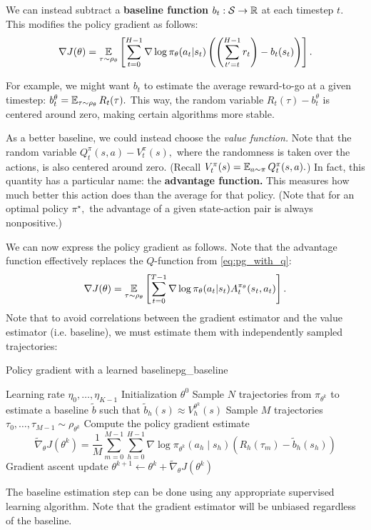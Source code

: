 \documentclass[\main/main]{subfiles}
\begin{document}
We can instead subtract a \textbf{baseline function} $b_t : \mathcal{S} \to \mathbb{R}$ at each timestep $t.$ This modifies the policy gradient as follows: \begin{equation}
    \nabla J(\theta) = \operatorname*{\mathbb{E}}_{\tau \sim \rho_\theta} \left[
        \sum_{t=0}^{H-1} \nabla \log \pi_\theta (a_t | s_t) \left(
        \left(
        \sum_{t' = t}^{H-1} r_t
        \right)
        - b_t(s_t)
        \right)
        \right].
    \label{eq:pg_baseline}
\end{equation}


For example, we might want $b_t$ to estimate the average reward-to-go at a given timestep: $b_t^\theta = \operatorname*{\mathbb{E}}_{\tau \sim \rho_\theta} R_t(\tau).$ This way,
the random variable $R_t(\tau) - b_t^\theta$ is centered around zero,
making certain algorithms more stable.

As a better baseline, we could instead choose the \emph{value function.} Note that the random variable $Q^\pi_t(s, a) - V^\pi_t(s),$ where the randomness is taken over the actions,
is also centered around zero. (Recall $V^\pi_t(s) = \operatorname*{\mathbb{E}}_{a \sim \pi} Q^\pi_t(s, a).$) In fact, this quantity has a particular name: the \textbf{advantage function.}
This measures how much better this action does than the average for that policy.
(Note that for an optimal policy $\pi^\star,$ the advantage of a given state-action pair is always nonpositive.)

We can now express the policy gradient as follows. Note that the advantage function effectively replaces the $Q$-function from \autoref{eq:pg_with_q}: \begin{equation}
    \nabla J(\theta) = \operatorname*{\mathbb{E}}_{\tau \sim \rho_\theta} \left[
        \sum_{t=0}^{T-1} \nabla \log \pi_\theta(a_t | s_t) A^{\pi_\theta}_t (s_t, a_t)
        \right].
    \label{eq:pg_advantage}
\end{equation}
Note that to avoid correlations between the gradient estimator and the value estimator (i.e. baseline), we must estimate them with independently sampled trajectories:
\begin{definition}{Policy gradient with a learned baseline}{pg_baseline}
    \begin{algorithmic}
        \Require Learning rate $\eta_0, \dots, \eta_{K-1}$
        \Require Initialization $\theta^0$
        \State Sample $N$ trajectories from $\pi_{\theta^k}$ to estimate a baseline $\tilde b$ such that $\tilde b_h(s) \approx V_h^{\theta^k}(s)$
        \State Sample $M$ trajectories $\tau_0, \dots, \tau_{M-1} \sim \rho_{\theta^k}$
        \State Compute the policy gradient estimate \[
            \tilde{\nabla}_\theta J(\theta^k) = \frac{1}{M} \sum_{m=0}^{M-1} \sum_{h=0}^{H-1} \nabla \log \pi_{\theta^k} (a_h \mid s_h) (R_h(\tau_m) - \tilde b_h(s_h))
        \]
        \State Gradient ascent update $\theta^{k+1} \gets \theta^k + \tilde \nabla_\theta J(\theta^k)$
        \EndFor
    \end{algorithmic}

    The baseline estimation step can be done using any appropriate supervised learning algorithm. Note that the gradient estimator will be unbiased regardless of the baseline.
\end{definition}
\end{document}
